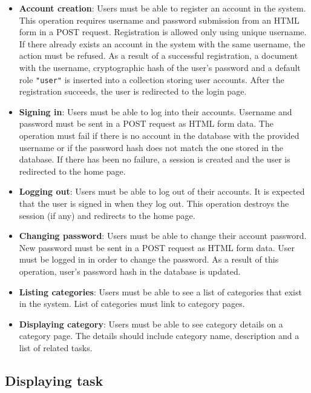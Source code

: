 \begin{itemize}
	\item \textbf{Account creation}: Users must be able to register an account in the system.
	This operation requires username and password submission from an HTML form in a POST request.
	Registration is allowed only using unique username. If there already exists an account in the system with the same username, the action must be refused.
	As a result of a successful registration, a document with the username, cryptographic hash of the user's password and a default role \texttt{"user"} is inserted into a collection storing user accounts. After the registration succeeds, the user is redirected to the login page.

	\item \textbf{Signing in}: Users must be able to log into their accounts.
	Username and password must be sent in a POST request as HTML form data. The operation must fail if there is no account in the database with the provided username or if the password hash does not match the one stored in the database.
	If there has been no failure, a session is created and the user is redirected to the home page.

	\item \textbf{Logging out}: Users must be able to log out of their accounts.
	It is expected that the user is signed in when they log out. This operation destroys the session (if any) and redirects to the home page.

	\item \textbf{Changing password}: Users must be able to change their account password.
	New password must be sent in a POST request as HTML form data. User must be logged in in order to change the password.
	As a result of this operation, user's password hash in the database is updated.

	\item \textbf{Listing categories}: Users must be able to see a list of categories that exist in the system. List of categories must link to category pages.

	\item \textbf{Displaying category}: Users must be able to see category details on a category page. The details should include category name, description and a list of related tasks.
\end{itemize}

\subsection{Displaying task}
